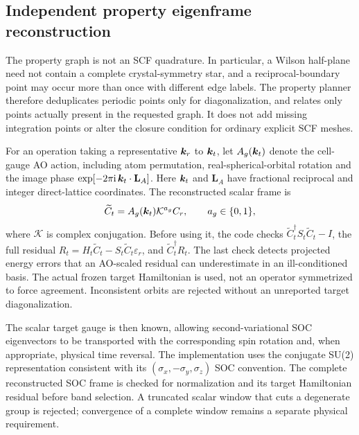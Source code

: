 \subsection{Independent property eigenframe reconstruction}
\label{sec:property-symmetry}
The property graph is not an SCF quadrature. In particular, a Wilson
half-plane need not contain a complete crystal-symmetry star, and a
reciprocal-boundary point may occur more than once with different edge
labels. The property planner therefore deduplicates periodic points only
for diagonalization, and relates only points actually present in the
requested graph. It does not add missing integration points or alter the
closure condition for ordinary explicit SCF meshes.

For an operation taking a representative $\bm{k}_r$ to $\bm{k}_t$, let
$A_g(\bm{k}_t)$ denote the cell-gauge AO action, including atom permutation,
real-spherical-orbital rotation and the image phase
$\exp[-2\pi\mathrm{i}\,\bm{k}_t\cdot\mathbf L_A]$. Here $\bm{k}_t$ and
$\mathbf L_A$ have fractional reciprocal and integer direct-lattice
coordinates. The reconstructed scalar frame is
\begin{equation}
 \widetilde C_t=A_g(\bm{k}_t)\mathcal K^{a_g}C_r,
 \qquad a_g\in\{0,1\},
\end{equation}
where $\mathcal K$ is complex conjugation. Before using it, the code
checks $\widetilde C_t^\dagger S_t\widetilde C_t-I$, the full residual
$R_t=H_t\widetilde C_t-S_t\widetilde C_t\varepsilon_r$, and
$\widetilde C_t^\dagger R_t$. The last check detects projected energy
errors that an AO-scaled residual can underestimate in an ill-conditioned
basis. The actual frozen target Hamiltonian is used, not an operator
symmetrized to force agreement. Inconsistent orbits are rejected without
an unreported target diagonalization.

The scalar target gauge is then known, allowing second-variational SOC
eigenvectors to be transported with the corresponding spin rotation and,
when appropriate, physical time reversal. The implementation uses the
conjugate SU(2) representation consistent with its
$(\sigma_x,-\sigma_y,\sigma_z)$ SOC convention. The complete reconstructed
SOC frame is checked for normalization and its target Hamiltonian
residual before band selection. A truncated scalar window that cuts a
degenerate group is rejected; convergence of a complete window remains
a separate physical requirement.

